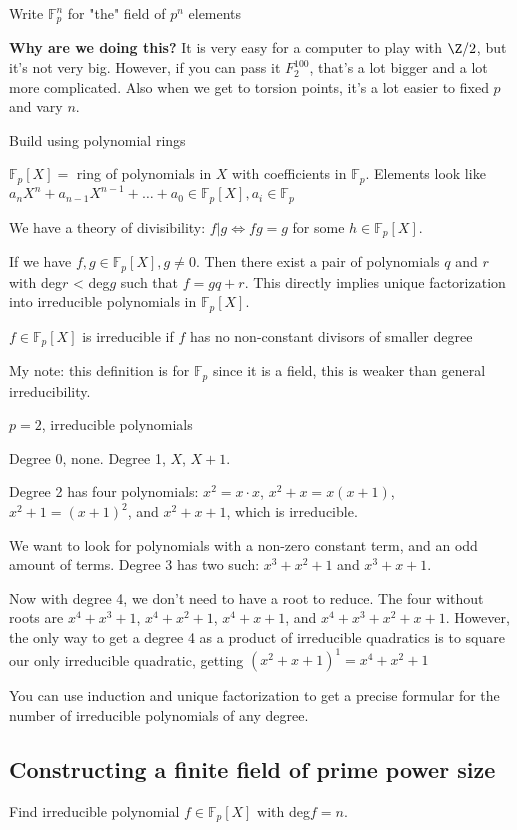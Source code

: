 \documentclass[10pt]{article}
\newcommand{\F}{\mathbb{F}}
\begin{document}
Write $\F_p^n$ for "the" field of $p^n$ elements

\textbf{Why are we doing this?} It is very easy for a computer to play with $\Z/2$, but it's not very big. However, if you can pass it $F_2^{100}$, that's a lot bigger and a lot more complicated. Also when we get to torsion points, it's a lot easier to fixed $p$ and vary $n$.

\begin{exm*}
    Build using polynomial rings 
\end{exm*}
$\F_p[X]=$ ring of polynomials in $X$ with coefficients in $\F_p$. Elements look like $a_nX^n + a_{n-1}X^{n-1} + \ldots + a_0 \in \F_p[X], a_i \in \F_p$

We have a theory of divisibility: $f | g \iff fg = g$ for some $h \in \F_p[X]$. 

If we have $f, g \in \F_p[X], g\neq 0$. Then there exist a pair of polynomials $q$ and $r$ with deg$r$ < deg$g$ such that $f = gq + r$. This directly implies unique factorization into irreducible polynomials in $\F_p[X]$. 

\begin{defn}
    $f\in \F_p[X]$ is irreducible if $f$ has no non-constant divisors of smaller degree
\end{defn}
My note: this definition is for $\F_p$ since it is a field, this is weaker than general irreducibility.

\begin{exm*}
    $p = 2$, irreducible polynomials
\end{exm*}
Degree 0, none. Degree 1, $X$, $X+1$.

Degree 2 has four polynomials: $x^2 = x\cdot x$, $x^2 + x = x(x + 1)$, $x^2 + 1 = (x+1)^2$, and $x^2 + x + 1$, which is irreducible. 

We want to look for polynomials with a non-zero constant term, and an odd amount of terms. Degree 3 has two such: $x^3 + x^2 + 1$ and $x^3 + x + 1$.

Now with degree 4, we don't need to have a root to reduce. The four without roots are $x^4 + x^3 + 1$, $x^4 + x^2 + 1$, $x^4 + x + 1$, and $x^4 + x^3 + x^2 + x + 1$. However, the only way to get a degree 4 as a product of irreducible quadratics is to square our only irreducible quadratic, getting $(x^2 + x + 1)^1 = x^4 + x^2 + 1$

You can use induction and unique factorization to get a precise formular for the number of irreducible polynomials of any degree.

\subsection{Constructing a finite field of prime power size} Find irreducible polynomial $f\in \F_p[X]$ with deg$f = n$.
\end{document}
